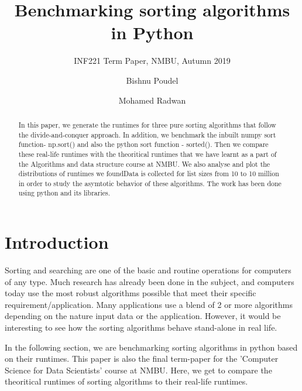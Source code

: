 \documentclass[sigconf,  natbib, screen]{acmart}
\begin{document}
\title{Benchmarking sorting algorithms in Python}
\subtitle{INF221 Term Paper, NMBU, Autumn 2019}

\author{Bishnu Poudel}

\author{Mohamed Radwan}

\begin{abstract}
In this paper, we generate the runtimes for three pure sorting algorithms that follow the divide-and-conquer approach. In addition, we benchmark the inbuilt numpy sort function- np.sort() and also the python sort function - sorted(). 
Then we compare these real-life runtimes with the theoritical runtimes that we have learnt as a part of the Algorithms 
and data structure course at NMBU. We also analyse and plot the distributions of runtimes we foundData is collected for list sizes  from 10 to 10 million in order to study the asymtotic behavior of these algorithms.
The work has been done using python and its libraries.
\end{abstract}

\maketitle

\section{Introduction}\label{sec:intro}


Sorting and searching are one of the basic and routine operations for computers of any type. Much research has already been done in the subject, and computers today use the most robust algorithms possible that meet their specific requirement/application. Many applications use a blend of 2 or more algorithms depending on the nature input data or the application.  However, it would be interesting to see how the  sorting algorithms behave stand-alone  in real life.

In the following section, we are benchmarking sorting algorithms in python based on their runtimes. This paper is also the final 
term-paper for the 'Computer Science for Data Scientists'  course at NMBU. Here, we get to compare the theoritical runtimes of sorting algorithms  to their real-life runtimes.
\end{document}
